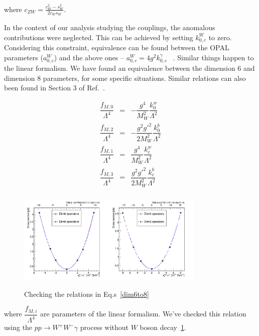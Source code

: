 where $c_{ZW} = \frac{c_W^2 - s_W^2}{2 c_W s_W}$.

In the context of our analysis %
studying the \wwaa couplings, the anomalous \wwza contributions were
neglected. This can be achieved by setting $k_{0,c}^W$ to
zero. Considering this constraint, equivalence can be found between
the OPAL parameters ($a_{0,c}^W$) and the above ones -- $a_{0,c}^W = 4
g^2 k_{0,c}^{\gamma}$ ~\cite{Belanger:1999}.  Similar things happen to
the linear formalism.  We have found an equivalence between the
dimension 6 and dimension 8 parameters, for some specific
situations. Similar relations can also been found in Section 3 of
Ref.~\cite{Belanger:1999}.

\begin{center}
\begin{eqnarray}
\dfrac{f_{M,0}}{\Lambda^4} &=& - \dfrac{g^4}{M^2_W} \dfrac{k_{0}^{w}}{\Lambda^2} \nonumber\\
\dfrac{f_{M,2}}{\Lambda^4} &=& - \dfrac{g^2 g'^2}{2 M^2_W} \dfrac{k_{0}^{b}}{\Lambda^2} \nonumber\\
\dfrac{f_{M,1}}{\Lambda^4} &=&  \dfrac{g^4}{M^2_W} \dfrac{k_{c}^{w}}{\Lambda^2} \nonumber\\
\dfrac{f_{M,3}}{\Lambda^4} &=&  \dfrac{g^2 g'^2}{2 M^2_W} \dfrac{k_{c}^{b}}{\Lambda^2}\\
&& \nonumber
\label{dim6to8}
\end{eqnarray}
\end{center}

\begin{figure}
  \centering
  \includegraphics[width=0.8\textwidth]{figs/comp68.png}\\
  \caption{Checking the relations in Eq.s~\ref{dim6to8}}\label{comp}
\end{figure}

where $\dfrac{f_{M,i}}{\Lambda^4}$ are parameters of the linear formalism. We've checked this relation using the $p p \to W^+ W^- \gamma$ process without $W$ boson decay~\ref{comp}.

